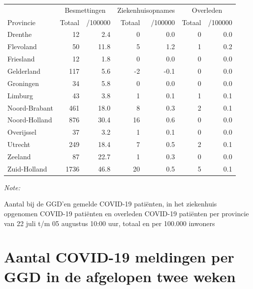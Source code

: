 \documentclass[
  english,
  man,floatsintext]{apa6}
\begin{document}
\begin{table}[H]
\centering
\begin{threeparttable}
\begin{tabular}{lrrrrrr}
\toprule
\multicolumn{1}{c}{ } & \multicolumn{2}{c}{Besmettingen} & \multicolumn{2}{c}{Ziekenhuisopnames} & \multicolumn{2}{c}{Overleden} \\
\cmidrule(l{3pt}r{3pt}){2-3} \cmidrule(l{3pt}r{3pt}){4-5} \cmidrule(l{3pt}r{3pt}){6-7}
Provincie & Totaal & /100000 & Totaal & /100000 & Totaal & /100000\\
\midrule
Drenthe & 12 & 2.4 & 0 & 0.0 & 0 & 0.0\\
Flevoland & 50 & 11.8 & 5 & 1.2 & 1 & 0.2\\
Friesland & 12 & 1.8 & 0 & 0.0 & 0 & 0.0\\
Gelderland & 117 & 5.6 & -2 & -0.1 & 0 & 0.0\\
Groningen & 34 & 5.8 & 0 & 0.0 & 0 & 0.0\\
Limburg & 43 & 3.8 & 1 & 0.1 & 1 & 0.1\\
Noord-Brabant & 461 & 18.0 & 8 & 0.3 & 2 & 0.1\\
Noord-Holland & 876 & 30.4 & 16 & 0.6 & 0 & 0.0\\
Overijssel & 37 & 3.2 & 1 & 0.1 & 0 & 0.0\\
Utrecht & 249 & 18.4 & 7 & 0.5 & 2 & 0.1\\
Zeeland & 87 & 22.7 & 1 & 0.3 & 0 & 0.0\\
Zuid-Holland & 1736 & 46.8 & 20 & 0.5 & 5 & 0.1\\
\bottomrule
\end{tabular}
\begin{tablenotes}
\item \textit{Note: } 
\item Aantal bij de GGD’en gemelde COVID-19 patiënten, in het ziekenhuis opgenomen COVID-19 patiënten en overleden COVID-19 patiënten per provincie van 22 juli t/m 05 augustus 10:00 uur, totaal en per 100.000 inwoners
\end{tablenotes}
\end{threeparttable}
\end{table}

\newpage

\hypertarget{aantal-covid-19-meldingen-per-ggd-in-de-afgelopen-twee-weken}{%
\section{Aantal COVID-19 meldingen per GGD in de afgelopen twee weken}\label{aantal-covid-19-meldingen-per-ggd-in-de-afgelopen-twee-weken}}
\end{document}
